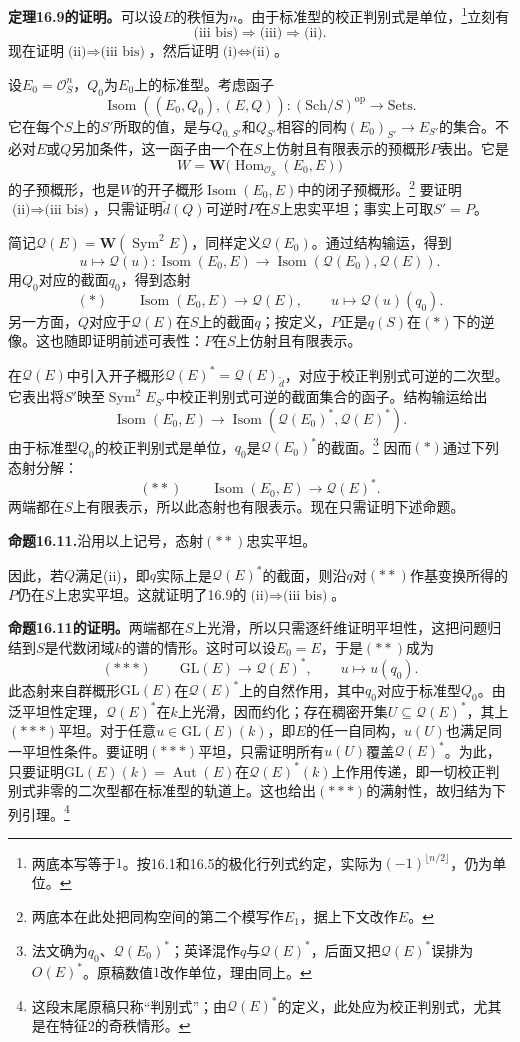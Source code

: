 \documentclass[openany,fontset=fandol]{ctexbook}
\newcommand{\OO}{\mathcal O}
\newcommand{\Qsp}{\mathcal Q}
\DeclareMathOperator{\Sym}{Sym}
\DeclareMathOperator{\Isom}{Isom}
\DeclareMathOperator{\Hom}{Hom}
\begin{document}
\noindent\textbf{定理16.9的证明。}\quad 可以设$E$的秩恒为$n$。由于标准型的校正判别式是单位，\footnote{两底本写等于$1$。按16.1和16.5的极化行列式约定，实际为$(-1)^{\lfloor n/2\rfloor}$，仍为单位。}立刻有
\[
  \text{(iii bis)}\Longrightarrow\text{(iii)}\Longrightarrow\text{(ii)} .
\]
现在证明$\text{(ii)}\Rightarrow\text{(iii bis)}$，然后证明$\text{(i)}\Leftrightarrow\text{(ii)}$。

设$E_0=\OO_S^n$，$Q_0$为$E_0$上的标准型。考虑函子
\[
 \Isom((E_0,Q_0),(E,Q)):(\mathrm{Sch}/S)^{\mathrm{op}}\longrightarrow\mathrm{Sets}.
\]
它在每个$S$上的$S'$所取的值，是与$Q_{0,S'}$和$Q_{S'}$相容的同构$(E_0)_{S'}\to E_{S'}$的集合。不必对$E$或$Q$另加条件，这一函子由一个在$S$上仿射且有限表示的预概形$P$表出。它是
\[
 W=\mathbf W\bigl(\Hom_{\OO_S}(E_0,E)\bigr)
\]
的子预概形，也是$W$的开子概形$\Isom(E_0,E)$中的闭子预概形。\footnote{两底本在此处把同构空间的第二个模写作$E_1$，据上下文改作$E$。} 要证明$\text{(ii)}\Rightarrow\text{(iii bis)}$，只需证明$\widetilde d(Q)$可逆时$P$在$S$上忠实平坦；事实上可取$S'=P$。

简记$\Qsp(E)=\mathbf W(\Sym^2 E)$，同样定义$\Qsp(E_0)$。通过结构输运，得到
\[
 u\longmapsto\Qsp(u):
 \Isom(E_0,E)\longrightarrow\Isom(\Qsp(E_0),\Qsp(E)).
\]
用$Q_0$对应的截面$q_0$，得到态射
\[
 (*)\qquad \Isom(E_0,E)\longrightarrow\Qsp(E),\qquad
 u\longmapsto\Qsp(u)(q_0).
\]
另一方面，$Q$对应于$\Qsp(E)$在$S$上的截面$q$；按定义，$P$正是$q(S)$在$(*)$下的逆像。这也随即证明前述可表性：$P$在$S$上仿射且有限表示。

在$\Qsp(E)$中引入开子概形$\Qsp(E)^*=\Qsp(E)_{\widetilde d}$，对应于校正判别式可逆的二次型。它表出将$S'$映至$\Sym^2 E_{S'}$中校正判别式可逆的截面集合的函子。结构输运给出
\[
 \Isom(E_0,E)\longrightarrow\Isom(\Qsp(E_0)^*,\Qsp(E)^*).
\]
由于标准型$Q_0$的校正判别式是单位，$q_0$是$\Qsp(E_0)^*$的截面。\footnote{法文确为$q_0$、$\Qsp(E_0)^*$；英译混作$q$与$\Qsp(E)^*$，后面又把$\Qsp(E)^*$误排为$O(E)^*$。原稿数值$1$改作单位，理由同上。} 因而$(*)$通过下列态射分解：
\[
 (**)\qquad \Isom(E_0,E)\longrightarrow\Qsp(E)^* .
\]
两端都在$S$上有限表示，所以此态射也有限表示。现在只需证明下述命题。

\noindent\textbf{命题16.11.}\quad 沿用以上记号，态射$(**)$忠实平坦。

因此，若$Q$满足(ii)，即$q$实际上是$\Qsp(E)^*$的截面，则沿$q$对$(**)$作基变换所得的$P$仍在$S$上忠实平坦。这就证明了16.9的$\text{(ii)}\Rightarrow\text{(iii bis)}$。

\noindent\textbf{命题16.11的证明。}\quad 两端都在$S$上光滑，所以只需逐纤维证明平坦性，这把问题归结到$S$是代数闭域$k$的谱的情形。这时可以设$E_0=E$，于是$(**)$成为
\[
 (***)\qquad \mathrm{GL}(E)\longrightarrow\Qsp(E)^*,\qquad u\longmapsto u(q_0).
\]
此态射来自群概形$\mathrm{GL}(E)$在$\Qsp(E)^*$上的自然作用，其中$q_0$对应于标准型$Q_0$。由泛平坦性定理，$\Qsp(E)^*$在$k$上光滑，因而约化；存在稠密开集$U\subseteq\Qsp(E)^*$，其上$(***)$平坦。对于任意$u\in\mathrm{GL}(E)(k)$，即$E$的任一自同构，$u(U)$也满足同一平坦性条件。要证明$(***)$平坦，只需证明所有$u(U)$覆盖$\Qsp(E)^*$。为此，只要证明$\mathrm{GL}(E)(k)=\operatorname{Aut}(E)$在$\Qsp(E)^*(k)$上作用传递，即一切校正判别式非零的二次型都在标准型的轨道上。这也给出$(***)$的满射性，故归结为下列引理。\footnote{这段末尾原稿只称“判别式”；由$\Qsp(E)^*$的定义，此处应为校正判别式，尤其是在特征2的奇秩情形。}
\end{document}
